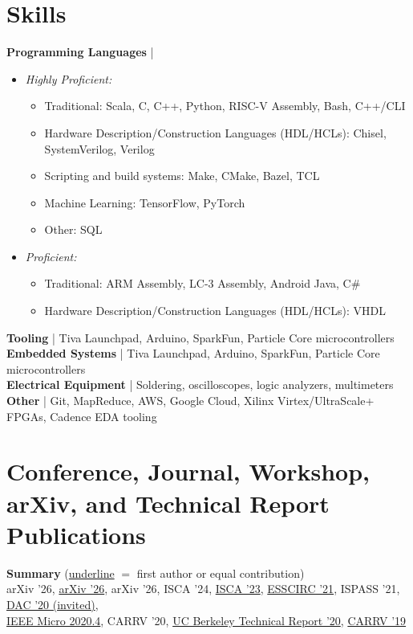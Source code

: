 \documentclass[line]{res}
\begin{document}
\begin{resume}

\section{\Large{Skills}}
\label{sec:skills}
\vspace{2mm}

\textbf{Programming Languages} |
\begin{itemize}
\item \textit{Highly Proficient:}
\begin{itemize}
\item Traditional: Scala, C, C++, Python, RISC-V Assembly, Bash, C++/CLI
\item Hardware Description/Construction Languages (HDL/HCLs): Chisel, SystemVerilog, Verilog
\item Scripting and build systems: Make, CMake, Bazel, TCL
\item Machine Learning: TensorFlow, PyTorch
\item Other: SQL
\end{itemize}
\item \textit{Proficient:}
\begin{itemize}
\item Traditional: ARM Assembly, LC-3 Assembly, Android Java, C\#
\item Hardware Description/Construction Languages (HDL/HCLs): VHDL
\end{itemize}
\end{itemize}
\vspace{-4mm}
\textbf{Tooling} | Tiva Launchpad, Arduino, SparkFun, Particle Core microcontrollers
\\
\textbf{Embedded Systems} | Tiva Launchpad, Arduino, SparkFun, Particle Core microcontrollers
\\
\textbf{Electrical Equipment} | Soldering, oscilloscopes, logic analyzers, multimeters
\\
\textbf{Other} | Git, MapReduce, AWS, Google Cloud, Xilinx Virtex/UltraScale+ FPGAs, Cadence EDA tooling

\section{\Large{Conference, Journal, Workshop, arXiv, and Technical Report Publications}}
\label{sec:pubs}
\vspace{2mm}

\textbf{Summary} (\underline{underline} $=$ first author or equal contribution)
\\
arXiv '26, \underline{arXiv '26}, arXiv '26, ISCA '24, \underline{ISCA '23}, \underline{ESSCIRC '21}, ISPASS '21, \underline{DAC '20 (invited)},\\
\underline{IEEE Micro 2020.4}, CARRV '20, \underline{UC Berkeley Technical Report '20}, \underline{CARRV '19}
\vspace{-0.8mm}


\end{resume}
\end{document}
